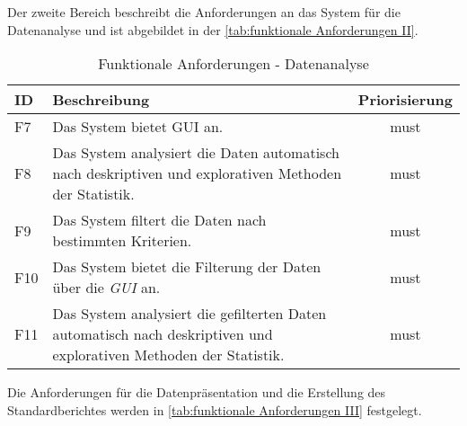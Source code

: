 Der zweite Bereich beschreibt die Anforderungen an das System für die Datenanalyse und ist abgebildet in der \autoref{tab:funktionale Anforderungen II}.

\begingroup
\setlength{\tabcolsep}{10pt} %
\renewcommand{\arraystretch}{1.0} 
\begin{table}[H]
    \centering
    \begin{adjustbox}{max width=\textwidth}
    \begin{tabular}{lp{14cm}c}
       \toprule
       \textbf{ID}          & \textbf{Beschreibung} &\textbf{Priorisierung}\\
       \midrule
        F7                               &Das System bietet \acrlong{GUI} an.  & must\\
        F8                               &Das System analysiert die Daten automatisch nach deskriptiven und explorativen Methoden der Statistik.  & must\\
        F9                               &Das System filtert die Daten nach bestimmten Kriterien.  & must\\ %
        F10                               &Das System bietet die Filterung der Daten über die \textit{\acrshort{GUI}} an.  & must\\
        F11                              &Das System analysiert die gefilterten Daten automatisch nach deskriptiven und explorativen Methoden der Statistik. & must\\                             
        \bottomrule
    \end{tabular}
    \end{adjustbox}
    \caption{%
        Funktionale Anforderungen - Datenanalyse
    }
    \label{tab:funktionale Anforderungen II}
    \end{table}
\endgroup

Die Anforderungen für die Datenpräsentation und die Erstellung des Standardberichtes werden in \autoref{tab:funktionale Anforderungen III} festgelegt.

